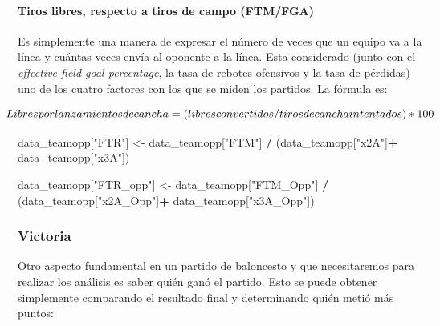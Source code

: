 \documentclass[
]{article}
\newenvironment{Shaded}{\begin{snugshade}}{\end{snugshade}}
\newcommand{\DecValTok}[1]{\textcolor[rgb]{0.00,0.00,0.81}{#1}}
\newcommand{\KeywordTok}[1]{\textcolor[rgb]{0.13,0.29,0.53}{\textbf{#1}}}
\newcommand{\NormalTok}[1]{#1}
\newcommand{\OperatorTok}[1]{\textcolor[rgb]{0.81,0.36,0.00}{\textbf{#1}}}
\newcommand{\StringTok}[1]{\textcolor[rgb]{0.31,0.60,0.02}{#1}}
\begin{document}
\hypertarget{tiros-libres-respecto-a-tiros-de-campo-ftmfga}{%
\paragraph{Tiros libres, respecto a tiros de campo
(FTM/FGA)}\label{tiros-libres-respecto-a-tiros-de-campo-ftmfga}}

Es simplemente una manera de expresar el número de veces que un equipo
va a la línea y cuántas veces envía al oponente a la línea. Esta
considerado (junto con el \emph{effective field goal percentage}, la
tasa de rebotes ofensivos y la tasa de pérdidas) uno de los cuatro
factores con los que se miden los partidos. La fórmula es:

\[
  \makebox[\linewidth]{$Libres por lanzamientos de cancha = (libres convertidos/tiros de cancha intentados) * 100$}
\]

\begin{Shaded}
\begin{Highlighting}[]
\NormalTok{data_teamopp[}\StringTok{"FTR"}\NormalTok{] <-}\StringTok{ }\NormalTok{data_teamopp[}\StringTok{"FTM"}\NormalTok{] }\OperatorTok{/}\StringTok{  }\NormalTok{(data_teamopp[}\StringTok{"x2A"}\NormalTok{]}\OperatorTok{+}\StringTok{ }\NormalTok{data_teamopp[}\StringTok{"x3A"}\NormalTok{])}

\NormalTok{data_teamopp[}\StringTok{"FTR_opp"}\NormalTok{] <-}\StringTok{ }\NormalTok{data_teamopp[}\StringTok{"FTM_Opp"}\NormalTok{] }\OperatorTok{/}
\StringTok{  }\NormalTok{(data_teamopp[}\StringTok{"x2A_Opp"}\NormalTok{]}\OperatorTok{+}\StringTok{ }\NormalTok{data_teamopp[}\StringTok{"x3A_Opp"}\NormalTok{])}
\end{Highlighting}
\end{Shaded}

\hypertarget{victoria}{%
\subsubsection{Victoria}\label{victoria}}

Otro aspecto fundamental en un partido de baloncesto y que necesitaremos
para realizar los análisis es saber quién ganó el partido. Esto se puede
obtener simplemente comparando el resultado final y determinando quién
metió más puntos:

\begin{Shaded}
\end{Shaded}
\end{document}
